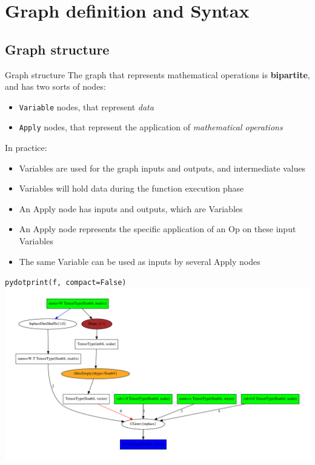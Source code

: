 \documentclass[a4paper,9pt]{beamer}
\begin{document}
\section{Graph definition and Syntax}
\begin{frame}
  \tableofcontents[currentsection]
\end{frame}

\subsection{Graph structure}
\begin{frame}[fragile]{Graph structure}
  The graph that represents mathematical operations is {\bf bipartite},
  and has two sorts of nodes:
  \begin{itemize}
    \item \verb|Variable| nodes, that represent {\em data}
    \item \verb|Apply| nodes, that represent the application of
      {\em mathematical operations}
  \end{itemize}
  In practice:
  \begin{itemize}
    \item Variables are used for the graph inputs and outputs, and intermediate values
    \item Variables will hold data during the function execution phase
    \item An Apply node has inputs and outputs, which are Variables
    \item An Apply node represents the specific application of an Op on these input Variables
    \item The same Variable can be used as inputs by several Apply nodes
  \end{itemize}
\end{frame}

\begin{frame}{\tt pydotprint(f, compact=False)}
    \includegraphics[width=\textwidth]{pydotprint_f_notcompact.pdf}
\end{frame}
\end{document}
